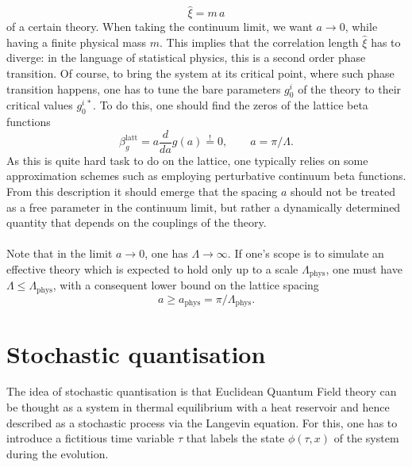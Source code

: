 \begin{equation*}   
    \hat\xi = m \, a
\end{equation*} 
of a certain theory. When taking the continuum limit, we want $a \to 0$, while having a finite physical mass $m$. This implies that the correlation length $\hat \xi$ has to diverge: in the language of statistical physics, this is a second order phase transition. Of course, to bring the system at its critical point, where such phase transition happens, one has to tune the bare parameters $g_0^i$ of the theory to their critical values $g_0^{i \, *}$. 
To do this, one should find the zeros of the lattice beta functions
\begin{equation*}
    \beta_g^\text{latt} = a \frac{d}{da} g(a) \overset{!}{=} 0, \qquad a = \pi/\Lambda.
\end{equation*}
As this is quite hard task to do on the lattice, one typically relies on some approximation schemes such as employing perturbative continuum beta functions. \\
From this description it should emerge that the spacing $a$ should not be treated as a free parameter in the continuum limit, but rather a dynamically determined quantity that depends on the couplings of the theory.\\~\\
Note that in the limit $a \to 0$, one has $\Lambda \to \infty$. If one's scope is to simulate an effective theory which is expected to hold only up to a scale $\Lambda_\text{phys}$, one must have $\Lambda \leq \Lambda_\text{phys}$, with a consequent lower bound on the lattice spacing 
\begin{equation*} 
    a \geq a_\text{phys} = \pi / \Lambda_\text{phys}.
\end{equation*}
\newpage
\section{Stochastic quantisation}
\label{sec:stochastic_quantisation}
The idea of stochastic quantisation \cite{ParisiWu,Damgaard1987StochasticQuantization} is that Euclidean Quantum Field theory can be thought as a system in thermal equilibrium with a heat reservoir and hence described as a stochastic process via the Langevin equation. For this, one has to introduce a fictitious time variable $\tau$ that labels the state $\phi(\tau, x)$ of the system 
during the evolution.
